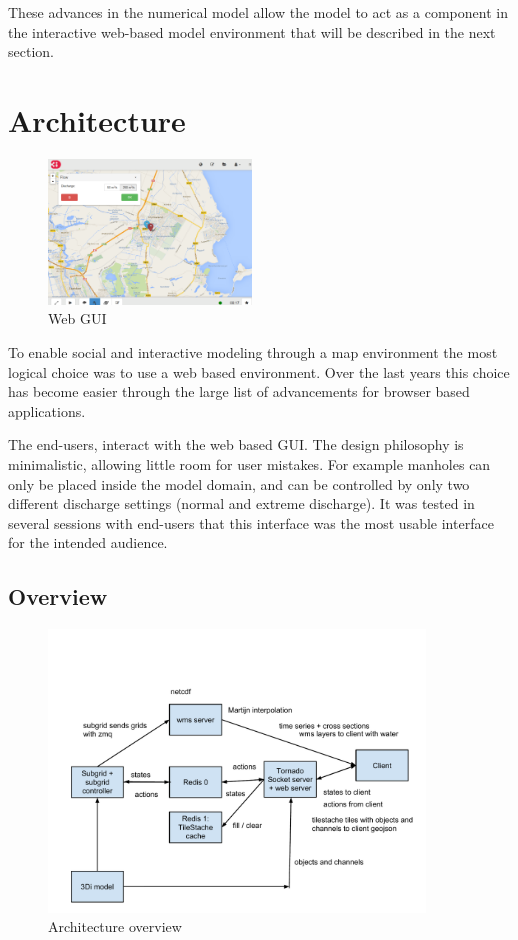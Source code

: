 \documentclass[a4paper]{article}
\begin{document}
%
These advances in the numerical model allow the model to act as a component in the interactive web-based model environment that will be described in the next section.

\section{Architecture}
\begin{figure}
  \centering
  \includegraphics[width=0.48\textwidth]{webgui}
  \caption{Web \ac{GUI}}
  \label{fig:gui}
\end{figure}

To enable social and interactive modeling through a map environment the most logical choice was to use a web based environment. Over the last years this choice has become easier through the large list of advancements for browser based applications.

The end-users, interact with the web based \ac{GUI}. The design philosophy is minimalistic, allowing little room for user mistakes. For example manholes can only be placed inside the model domain, and can be controlled by only two different discharge settings (normal and extreme discharge). It was tested in several sessions with end-users that this interface was the most usable interface for the intended audience.



\subsection{Overview}
\begin{figure}[h]
  \centering
  \includegraphics[width=10cm]{architecture}
  \caption{Architecture overview}
  \label{fig:arch}
\end{figure}
\end{document}
